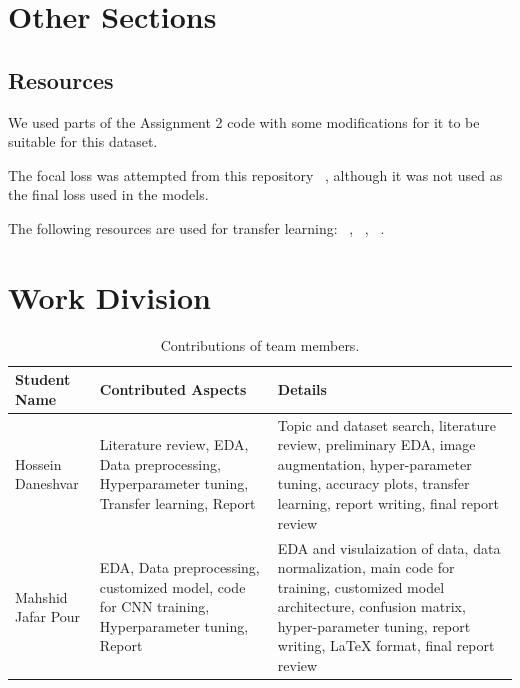 \documentclass[10pt,twocolumn,letterpaper]{article}
\begin{document}
\section{Other Sections}
\subsection {Resources}
We used parts of the Assignment 2 code with some modifications for it to be suitable for this dataset.

The focal loss was attempted from this repository ~\cite{repo01}, although it was not used as the final loss used in the models. 

The following resources are used for transfer learning: ~\cite{ref01}, ~\cite{ref02}, ~\cite{ref03}.


\section{Work Division}
\begin{table}
\begin{center}
\begin{tabular}{|l|p{4cm}|p{4cm}|}
\hline
Student Name & Contributed Aspects & Details \\
\hline\hline
Hossein Daneshvar &  Literature review, EDA, Data preprocessing, Hyperparameter tuning, Transfer learning, Report  &  Topic and dataset search, literature review, preliminary EDA, image augmentation, hyper-parameter tuning, accuracy plots, transfer learning, report writing, final report review \\
\hline
Mahshid Jafar Pour &  EDA, Data preprocessing, customized model, code for CNN training, Hyperparameter tuning, Report & EDA and visulaization of data, data normalization, main code for training, customized model architecture, confusion matrix, hyper-parameter tuning, report writing, LaTeX format, final report review\\
\hline
\end{tabular}
\end{center}
\caption{Contributions of team members.}
\label{tab:contributions}
\end{table}



{\small


}
\end{document}
